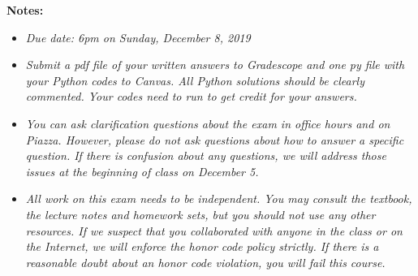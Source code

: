 \documentclass[12pt]{article}
\theoremstyle{remark}
\begin{document}
\renewcommand{\headrulewidth}{0.5pt}

\phantom{Test}
\noindent
{\bf Notes:}
\begin{itemize}
\item {\em Due date: 6pm on Sunday, December 8, 2019}
\vspace{-2mm}
\item {\em Submit a pdf file of your written answers to Gradescope and one py file with your Python codes to Canvas. All Python solutions should be clearly commented. Your codes need to run to get credit for your answers.}
\vspace{-2mm}
\item {\em You can ask clarification questions about the exam in office hours and on Piazza. However, please do not ask questions about how to answer a specific question. If there is confusion about any questions, we will address those issues at the beginning of class on December 5.}
\vspace{-2mm}
\item {\em All work on this exam needs to be independent. You may consult the textbook, the lecture notes and homework sets, but you should not use any other resources. If we suspect that you collaborated with anyone in the class or on the Internet, we will enforce the honor code policy strictly. If there is a reasonable doubt about an honor code violation,  you will fail this course.}
\end{itemize}

\hrulefill
\end{document}
